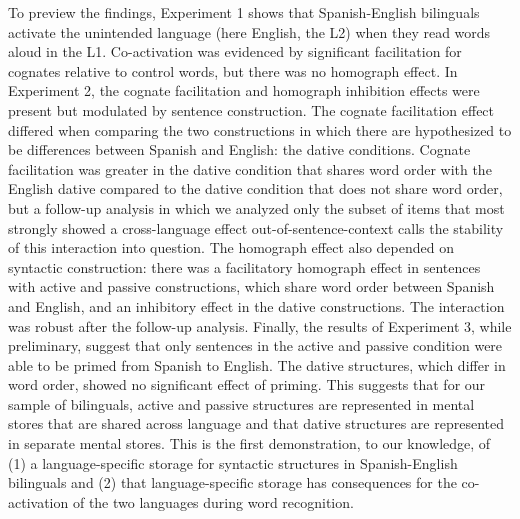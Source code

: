 To preview the findings, Experiment 1 shows that Spanish-English bilinguals activate the unintended language (here English, the L2) when they read words aloud in the L1. Co-activation was evidenced by significant facilitation for cognates relative to control words, but there was no homograph effect. In Experiment 2, the cognate facilitation and homograph inhibition effects were present but modulated by sentence construction. The cognate facilitation effect differed when comparing the two constructions in which there are hypothesized to be differences between Spanish and English: the dative conditions. Cognate facilitation was greater in the dative condition that shares word order with the English dative compared to the dative condition that does not share word order, but a follow-up analysis in which we analyzed only the subset of items that most strongly showed a cross-language effect out-of-sentence-context calls the stability of this interaction into question. The homograph effect also depended on syntactic construction: there was a facilitatory homograph effect in sentences with active and passive constructions, which share word order between Spanish and English, and an inhibitory effect in the dative constructions. The interaction was robust after the follow-up analysis. Finally, the results of Experiment 3, while preliminary, suggest that only sentences in the active and passive condition were able to be primed from Spanish to English. The dative structures, which differ in word order, showed no significant effect of priming. This suggests that for our sample of bilinguals, active and passive structures are represented in mental stores that are shared across language and that dative structures are represented in separate mental stores. This is the first demonstration, to our knowledge, of (1) a language-specific storage for syntactic structures in Spanish-English bilinguals and (2) that language-specific storage has consequences for the co-activation of the two languages during word recognition. 

